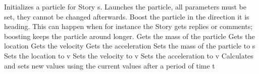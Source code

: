 \begin{classmetadata}
\end{classmetadata}

\begin{interface}
    {Initializes a particle for Story s.}
    {Launches the particle, all parameters must be set, they cannot be changed
      afterwards.}
    {Boost the particle in the direction it is heading. This can happen when
      for instance the Story gets replies or comments; boosting keeps the
      particle around longer.}
    {Gets the mass of the particle}
    {Gets the location}
    {Gets the velocity}
    {Gets the acceleration}
    {Sets the mass of the particle to s}
    {Sets the location to v}
    {Sets the velocity to v}
    {Sets the acceleration to v}
    {Calculates and sets new values using the current values after a period of
      time t}
\end{interface}




\begin{classmetadata}
\end{classmetadata}



